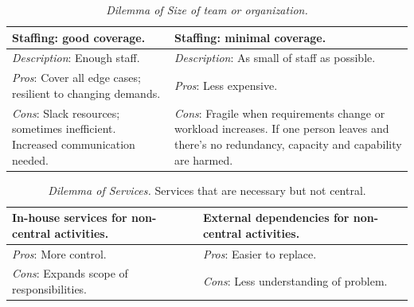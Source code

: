 \begin{center}
\begin{table}[H] %
\begin{tabular}{ | m{\dilemmatablewidth}| m{\dilemmatablewidth} | } 
  \hline
  \textbf{Staffing: good coverage.} &
  \textbf{Staffing: minimal coverage.} \\
  \hline
  \textit{Description}: Enough staff. &
  \textit{Description}: As small of staff as possible. \\  
  \hline
  \textit{Pros}: Cover all edge cases; resilient to changing demands. &
  \textit{Pros}: Less expensive. \\
  \hline
  \textit{Cons}: Slack resources; sometimes inefficient. Increased communication needed. & 
  \textit{Cons}: Fragile when requirements change or workload increases. If one person leaves and there's no redundancy, capacity and capability are harmed.  \\
  \hline
\end{tabular}
\caption{
\textit{Dilemma of Size of team or organization.}
}
\label{table:dilemma-org-staff-many-vs-few}
\end{table}
\end{center}



\begin{center}
\begin{table}[H] %
\begin{tabular}{ | m{\dilemmatablewidth}| m{\dilemmatablewidth} | } 
  \hline
  \textbf{In-house services for non-central activities.} &
  \textbf{External dependencies for non-central activities.} \\
  \hline
  \textit{Pros}: More control. &
  \textit{Pros}: Easier to replace. \\
  \hline
  \textit{Cons}: Expands scope of responsibilities. & 
  \textit{Cons}: Less understanding of problem.  \\
  \hline
\end{tabular}
\caption{
\textit{Dilemma of Services.}
Services that are necessary but not central.
}
\label{table:dilemma-org-inhouse-vs-external}
\end{table}
\end{center}

